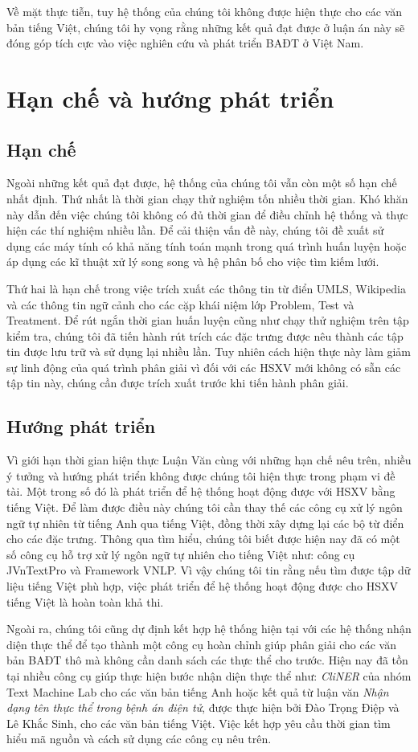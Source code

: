 Về mặt thực tiễn, tuy hệ thống của chúng tôi không được hiện thực cho các văn bản tiếng Việt, chúng tôi hy vọng rằng những kết quả đạt được ở luận án này sẽ đóng góp tích cực vào việc nghiên cứu và phát triển BAĐT ở Việt Nam.

\section{Hạn chế và hướng phát triển}
\subsection*{Hạn chế}
Ngoài những kết quả đạt được, hệ thống của chúng tôi vẫn còn một số hạn chế nhất định. Thứ nhất là thời gian chạy thử nghiệm tốn nhiều thời gian. Khó khăn này dẫn đến việc chúng tôi không có đủ thời gian để điều chỉnh hệ thống và thực hiện các thí nghiệm nhiều lần. Để cải thiện vấn đề này, chúng tôi đề xuất sử dụng các máy tính có khả năng tính toán mạnh trong quá trình huấn luyện hoặc áp dụng các kĩ thuật xử lý song song và hệ phân bố cho việc tìm kiếm lưới.

Thứ hai là hạn chế trong việc trích xuất các thông tin từ điển UMLS, Wikipedia và các thông tin ngữ cảnh cho các cặp khái niệm lớp Problem, Test và Treatment. Để rút ngắn thời gian huấn luyện cũng như chạy thử nghiệm trên tập kiểm tra, chúng tôi đã tiến hành rút trích các đặc trưng được nêu thành các tập tin được lưu trữ và sử dụng lại nhiều lần. Tuy nhiên cách hiện thực này làm giảm sự linh động của quá trình phân giải vì đối với các HSXV mới không có sẵn các tập tin này, chúng cần được trích xuất trước khi tiến hành phân giải.

\subsection*{Hướng phát triển}
Vì giới hạn thời gian hiện thực Luận Văn cùng với những hạn chế nêu trên, nhiều ý tưởng và hướng phát triển không được chúng tôi hiện thực trong phạm vi đề tài. Một trong số đó là phát triển để hệ thống hoạt động được với HSXV bằng tiếng Việt. Để làm được điều này chúng tôi cần thay thế các công cụ xử lý ngôn ngữ tự nhiên từ tiếng Anh qua tiếng Việt, đồng thời xây dựng lại các bộ từ điển cho các đặc trưng. Thông qua tìm hiểu, chúng tôi biết được hiện nay đã có một số công cụ hỗ trợ xử lý ngôn ngữ tự nhiên cho tiếng Việt như: công cụ JVnTextPro và Framework VNLP. Vì vậy chúng tôi tin rằng nếu tìm được tập dữ liệu tiếng Việt phù hợp, việc phát triển để hệ thống hoạt động được cho HSXV tiếng Việt là hoàn toàn khả thi.

Ngoài ra, chúng tôi cũng dự định kết hợp hệ thống hiện tại với các hệ thống nhận diện thực thể để tạo thành một công cụ hoàn chỉnh giúp phân giải cho các văn bản BAĐT thô mà không cần danh sách các thực thể cho trước. Hiện nay đã tồn tại nhiều công cụ giúp thực hiện bước nhận diện thực thể như: \textit{CliNER} của nhóm Text Machine Lab cho các văn bản tiếng Anh hoặc kết quả từ luận văn \textit{Nhận dạng tên thực thể trong bệnh án điện tử}, được thực hiện bởi Đào Trọng Điệp và Lê Khắc Sinh, cho các văn bản tiếng Việt. Việc kết hợp yêu cầu thời gian tìm hiểu mã nguồn và cách sử dụng các công cụ nêu trên.

